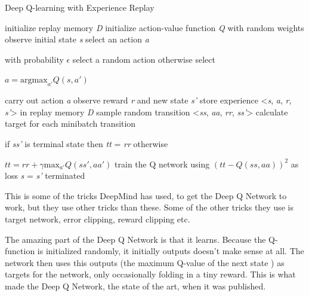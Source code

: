 \begin{algorithm}
	\caption{Deep Q-learning with Experience Replay}
	\label{algo:DQN}
	\begin{algorithmic}[]
		\State initialize replay memory \textit{D}
		\State initialize action-value function \textit{Q} with random weights
		\State observe initial state \textit{s} 
		\Repeat
			\State select an action \textit{a}
				\par with probability $\epsilon$ select a random action otherwise select 
				\par $a = \mathrm{argmax}_{a'}Q(s,a')$
		
			\State carry out action \textit{a}
			\State observe reward \textit{r} and new state \textit{s'}
			\State store experience <\textit{s}, \textit{a}, \textit{r}, \textit{s'}> in replay memory \textit{D}
			\newline
			\State sample random transition <\textit{ss}, \textit{aa}, \textit{rr}, \textit{ss'}>      
			\State calculate target for each minibatch transition
				\par if \textit{ss'} is terminal state then \textit{tt} = \textit{rr} otherwise 
				\par $tt = rr + \gamma \mathrm{max}_{a'}Q(ss',aa')$
			\State train the Q network using $(\textit{tt} - Q(\textit{ss}, \textit{aa}))^2$ as loss	
			\newline
			\State \textit{s} = \textit{s'}
		\Until terminated
	\end{algorithmic}
\end{algorithm}

This is some of the tricks DeepMind has used, to get the Deep Q Network to work, but they use other tricks than these. Some of the other tricks they use is target network, error clipping, reward clipping etc. 

The amazing part of the Deep Q Network is that it learns. Because the Q-function is initialized randomly, it initially outputs doesn't make sense at all. The network then uses this outputs (the maximum Q-value of the next state ) as targets for the network, only occasionally folding in a tiny reward. This is what made the Deep Q Network, the state of the art, when it was published. \cite{DQN_theory} \cite{DQN_Flappy} 

        